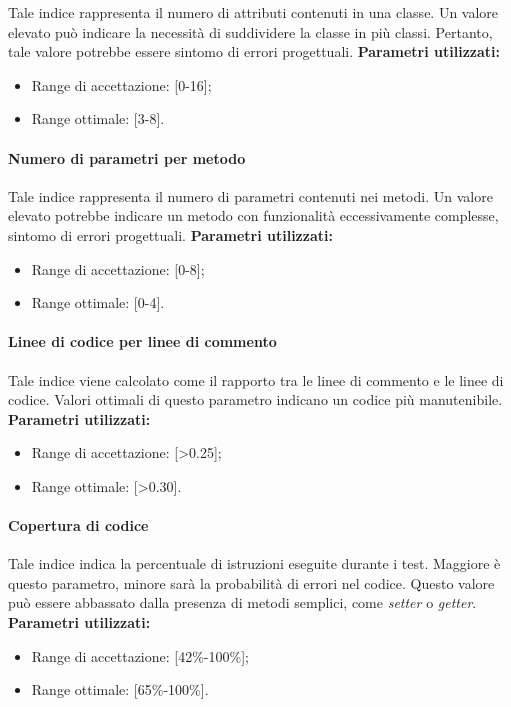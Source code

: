 Tale indice rappresenta il numero di attributi contenuti in una classe. Un valore elevato può indicare la necessità di suddividere la classe in più classi. Pertanto, tale valore potrebbe essere sintomo di errori progettuali. \newline \newline
\textbf{Parametri utilizzati:}
\begin{itemize}
	\item Range di accettazione: [0-16];
	\item Range ottimale: [3-8].
\end{itemize}

\paragraph{Numero di parametri per metodo}

Tale indice rappresenta il numero di parametri contenuti nei metodi. Un valore elevato potrebbe indicare un metodo con funzionalità eccessivamente complesse, sintomo di errori progettuali.\newline \newline
\textbf{Parametri utilizzati:}
\begin{itemize}
	\item Range di accettazione: [0-8];
	\item Range ottimale: [0-4].
\end{itemize}

\paragraph{Linee di codice per linee di commento}

Tale indice viene calcolato come il rapporto tra le linee di commento e le linee di codice. Valori ottimali di questo parametro indicano un codice più manutenibile. \newline \newline
\textbf{Parametri utilizzati:}
\begin{itemize}
	\item Range di accettazione: [>0.25];
	\item Range ottimale: [>0.30].
\end{itemize}

\paragraph{Copertura di codice}

Tale indice indica la percentuale di istruzioni eseguite durante i test. Maggiore è questo parametro, minore sarà la probabilità di errori nel codice. Questo valore può essere abbassato dalla presenza di metodi semplici, come \textit{setter} o \textit{getter}. \newline \newline
\textbf{Parametri utilizzati:}
\begin{itemize}
	\item Range di accettazione: [42\%-100\%];
	\item Range ottimale: [65\%-100\%].
\end{itemize}
\newpage
